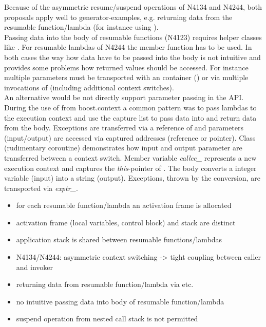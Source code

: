 Because of the asymmetric resume/suspend operations of N4134 and N4244, both
proposals apply well to generator-examples, e.g. returning data from the
resumable function/lambda (for instance using \yield).\\
Passing data into the body of resumable functions (N4123) requires helper
classes like \channel.
For resumable lambdas of N4244 the member function \rlwanted has to be used.
In both cases the way how data have to be passed into the body is not intuitive
and provides some problems how returned values should be accessed. For instance
multiple parameters must be transported with an container (\tuple) or via
multiple invocations of \rlwanted (including additional context switches).\\
\newline
An alternative would be not directly support parameter passing in the API.\\
During the use of  from boost.context\cite{bcontext} a
common pattern was to pass lambdas to the execution context and use the capture
list to pass data into and return data from the body. Exceptions are transferred
via a reference of \excpt and parameters (input/output) are accessed via
captured addresses (reference or pointer).
Class  (rudimentary coroutine) demonstrates how input and output
parameter are transferred between a context switch. Member variable
\textit{callee\_} represents a new execution context and captures the
\textit{this}-pointer of . The body converts a integer variable (input)
into a string (output). Exceptions, thrown by the conversion, are transported
via \textit{exptr\_}.

\begin{itemize}
    \item   for each resumable function/lambda an activation frame is allocated
    \item   activation frame (local variables, control block) and stack are
            distinct
    \item   application stack is shared between resumable functions/lambdas
    \item   N4134/N4244: asymmetric context switching -> tight coupling between
            caller and invoker
    \item   returning data from resumable function/lambda via \yield etc.
    \item   no intuitive passing data into body of resumable function/lambda
    \item   suspend operation from nested call stack is not permitted
\end{itemize}

